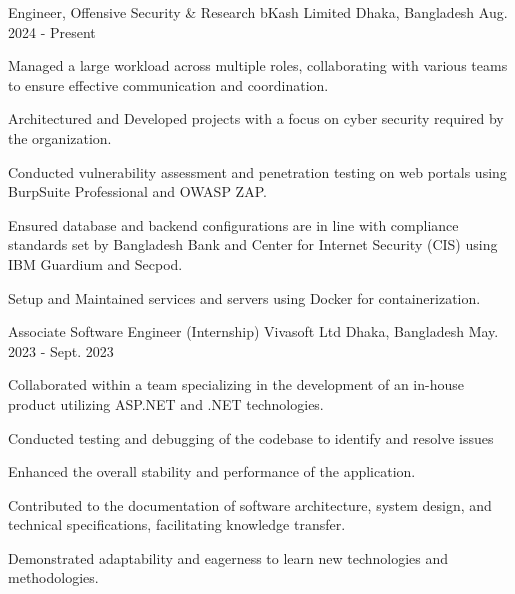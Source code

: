 

\begin{cventries}

  \cventry
    {Engineer, Offensive Security \& Research} %
    {bKash Limited} %
    {Dhaka, Bangladesh} %
    {Aug. 2024 - Present} %
    {
      \begin{cvitems} %
        \item Managed a large workload across multiple roles, collaborating with various teams to ensure effective communication and coordination.
        \item Architectured and Developed projects with a focus on cyber security required by the organization.
        \item Conducted vulnerability assessment and penetration testing on web portals using BurpSuite Professional and OWASP ZAP.
        \item Ensured database and backend configurations are in line with compliance standards set by Bangladesh Bank and Center for Internet Security (CIS) using IBM Guardium and Secpod.
        \item Setup and Maintained services and servers using Docker for containerization.
      \end{cvitems}
    }

  \cventry
    {Associate Software Engineer (Internship)} %
    {Vivasoft Ltd} %
    {Dhaka, Bangladesh} %
    {May. 2023 - Sept. 2023} %
    {
      \begin{cvitems} %
        \item Collaborated within a team specializing in the development of an in-house product utilizing ASP.NET and .NET technologies.
        \item Conducted testing and debugging of the codebase to identify and resolve issues
        \item Enhanced the overall stability and performance of the application.
        \item Contributed to the documentation of software architecture, system design, and technical specifications, facilitating knowledge transfer.
        \item Demonstrated adaptability and eagerness to learn new technologies and methodologies.
      \end{cvitems}
    }


\end{cventries}
